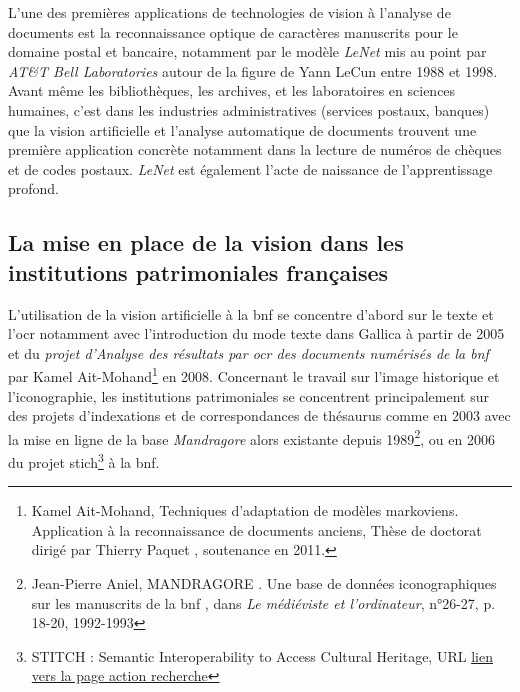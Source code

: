 L'une des premières applications de technologies de vision à l'analyse de documents est la reconnaissance optique de caractères manuscrits pour le domaine postal et bancaire, notamment par le modèle \textit{LeNet} mis au point par \textit{AT\&T Bell Laboratories} autour de la figure de Yann LeCun entre 1988 et 1998. Avant même les bibliothèques, les archives, et les laboratoires en sciences humaines, c'est dans les industries administratives (services postaux, banques) que la vision artificielle et l'analyse automatique de documents trouvent une première application concrète notamment dans la lecture de numéros de chèques et de codes postaux. \textit{LeNet} est également l'acte de naissance de l'apprentissage profond.

\subsection{La mise en place de la vision dans les institutions patrimoniales françaises}

L'utilisation de la vision artificielle à la \gls{bnf} se concentre d'abord sur le texte et l'\gls{ocr} notamment avec l'introduction du mode texte dans Gallica à partir de 2005 et du \textit{projet d'Analyse des résultats par \gls{ocr} des documents numérisés de la \gls{bnf}} par Kamel Ait-Mohand\footnote{Kamel Ait-Mohand, \og Techniques d'adaptation de modèles markoviens. Application à la reconnaissance de documents anciens\fg, Thèse de doctorat dirigé par Thierry Paquet , soutenance en 2011.} en 2008. Concernant le travail sur l'image historique et l'iconographie, les institutions patrimoniales se concentrent principalement sur des projets d'indexations et de correspondances de thésaurus comme en 2003 avec la mise en ligne de la base \textit{Mandragore} alors existante depuis 1989\footnote{Jean-Pierre Aniel, \og MANDRAGORE . Une base de données iconographiques sur les manuscrits de la \gls{bnf} \fg, dans \textit{Le médiéviste et l'ordinateur}, n°26-27, p. 18-20, 1992-1993}, ou en 2006 du projet \gls{stich}\footnote{\og STITCH : Semantic Interoperability to Access Cultural Heritage\fg , URL \href{https://actions-recherche.bnf.fr/bnf/anirw3.nsf/IX01/A2014000409\_stitch-semantic-interoperability-to-access-cultural-heritage?opendocument\&n=1\&categorie=2006}{lien vers la page action recherche}} à la \gls{bnf}. 

